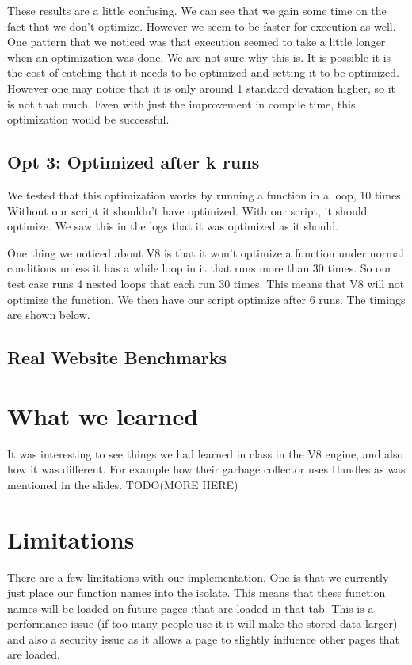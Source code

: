 \documentclass[twocolumn,showpacs,%
  nofootinbib,aps,superscriptaddress,%
  eqsecnum,prd,notitlepage,showkeys,10pt]{revtex4-1}
\begin{document}
These results are a little confusing. We can see that we gain some time on the fact that we don't optimize. However we seem to be faster for execution as well. One pattern that we noticed was that execution seemed to take a little longer when an optimization was done. We are not sure why this is. It is possible it is  the cost of catching that it needs to be optimized and setting it to be optimized. However one may notice that it is only around 1 standard devation higher, so it is not that much. Even with just the improvement in compile time, this optimization would be successful. 


\subsection{Opt 3: Optimized after k runs}
We tested that this optimization works by running a function in a loop, 10 times. Without our script it shouldn't have optimized. With our script, it should optimize. We saw this in the logs that it was optimized as it should.

One thing we noticed about V8 is that it won't optimize a function under normal conditions unless it has a while loop in it that runs more than 30 times. So our test case runs 4 nested loops that each run 30 times. This means that V8 will not optimize the function. We then have our script optimize after 6 runs. The timings are shown below.

\subsection{Real Website Benchmarks}


\section {What we learned}
It was interesting to see things we had learned in class in the V8 engine, and also how it was different. For example how their garbage collector uses Handles as was mentioned in the slides.
TODO(MORE HERE)

\section{Limitations}
There are a few limitations with our implementation. One is that we currently just place our function names into the isolate. This means that these function names will be loaded on future pages :that are loaded in that tab. This is a performance issue (if too many people use it it will make the stored data larger) and also a security issue as it allows a page to slightly influence other pages that are loaded.
\end{document}
